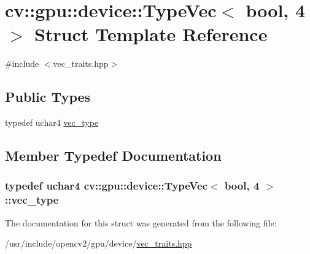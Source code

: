 \hypertarget{structcv_1_1gpu_1_1device_1_1TypeVec_3_01bool_00_014_01_4}{\section{cv\-:\-:gpu\-:\-:device\-:\-:Type\-Vec$<$ bool, 4 $>$ Struct Template Reference}
\label{structcv_1_1gpu_1_1device_1_1TypeVec_3_01bool_00_014_01_4}
}


{\ttfamily \#include $<$vec\-\_\-traits.\-hpp$>$}

\subsection*{Public Types}
\begin{DoxyCompactItemize}
\item 
typedef uchar4 \hyperlink{structcv_1_1gpu_1_1device_1_1TypeVec_3_01bool_00_014_01_4_a17b0381d1ef975c2b6bbd9ea0e71d954}{vec\-\_\-type}
\end{DoxyCompactItemize}


\subsection{Member Typedef Documentation}
\hypertarget{structcv_1_1gpu_1_1device_1_1TypeVec_3_01bool_00_014_01_4_a17b0381d1ef975c2b6bbd9ea0e71d954}{
\subsubsection[{vec\-\_\-type}]{\setlength{\rightskip}{0pt plus 5cm}typedef uchar4 {\bf cv\-::gpu\-::device\-::\-Type\-Vec}$<$ bool, 4 $>$\-::{\bf vec\-\_\-type}}}\label{structcv_1_1gpu_1_1device_1_1TypeVec_3_01bool_00_014_01_4_a17b0381d1ef975c2b6bbd9ea0e71d954}


The documentation for this struct was generated from the following file\-:\begin{DoxyCompactItemize}
\item 
/usr/include/opencv2/gpu/device/\hyperlink{vec__traits_8hpp}{vec\-\_\-traits.\-hpp}\end{DoxyCompactItemize}
